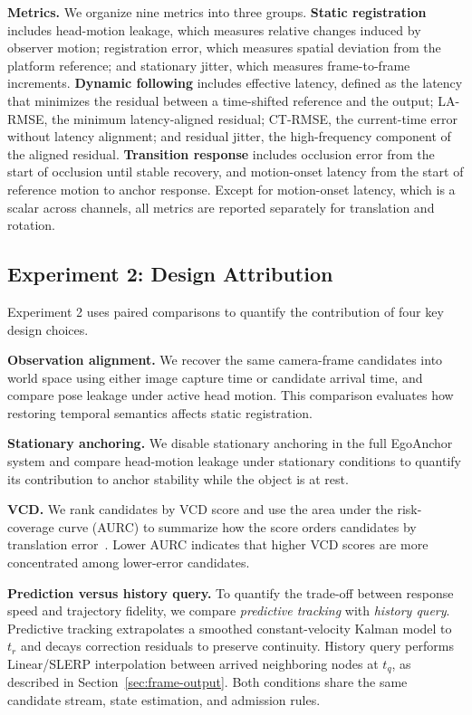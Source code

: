 \documentclass[review]{vgtc}
\begin{document}
\textbf{Metrics.}
We organize nine metrics into three groups. \textbf{Static registration} includes head-motion leakage, which measures relative changes induced by observer motion; registration error, which measures spatial deviation from the platform reference; and stationary jitter, which measures frame-to-frame increments. \textbf{Dynamic following} includes effective latency, defined as the latency that minimizes the residual between a time-shifted reference and the output; LA-RMSE, the minimum latency-aligned residual; CT-RMSE, the current-time error without latency alignment; and residual jitter, the high-frequency component of the aligned residual. \textbf{Transition response} includes occlusion error from the start of occlusion until stable recovery, and motion-onset latency from the start of reference motion to anchor response. Except for motion-onset latency, which is a scalar across channels, all metrics are reported separately for translation and rotation.

\subsection{Experiment 2: Design Attribution}\label{sec:exp2-design}

Experiment 2 uses paired comparisons to quantify the contribution of four key design choices.

\textbf{Observation alignment.}
We recover the same camera-frame candidates into world space using either image capture time or candidate arrival time, and compare pose leakage under active head motion. This comparison evaluates how restoring temporal semantics affects static registration.

\textbf{Stationary anchoring.}
We disable stationary anchoring in the full EgoAnchor system and compare head-motion leakage under stationary conditions to quantify its contribution to anchor stability while the object is at rest.

\textbf{VCD.}
We rank candidates by VCD score and use the area under the risk-coverage curve (AURC) to summarize how the score orders candidates by translation error~\cite{riskcontrolled2020,ding2020uncertainty}. Lower AURC indicates that higher VCD scores are more concentrated among lower-error candidates.

\textbf{Prediction versus history query.}
To quantify the trade-off between response speed and trajectory fidelity, we compare \emph{predictive tracking} with \emph{history query}. Predictive tracking extrapolates a smoothed constant-velocity Kalman model to $t_r$ and decays correction residuals to preserve continuity. History query performs Linear/SLERP interpolation between arrived neighboring nodes at $t_q$, as described in Section~\ref{sec:frame-output}. Both conditions share the same candidate stream, state estimation, and admission rules.
\end{document}
